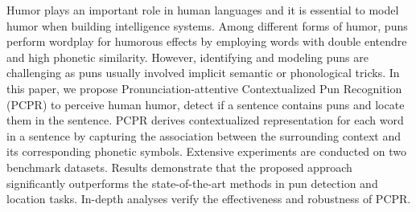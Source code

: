 Humor plays an important role in human languages and it is essential to model humor when building intelligence systems. Among different forms of humor, puns perform wordplay for humorous effects by employing words with double entendre and high phonetic similarity. However, identifying and modeling puns are challenging as puns usually involved implicit semantic or phonological tricks. In this paper, we propose Pronunciation-attentive Contextualized Pun Recognition (PCPR) to perceive human humor, detect if a sentence contains puns and locate them in the sentence.  PCPR derives contextualized representation for each word in a sentence by capturing the association between the surrounding context and its corresponding phonetic symbols. Extensive experiments are conducted on two benchmark datasets. Results demonstrate that the proposed approach significantly outperforms the state-of-the-art methods in pun detection and location tasks. In-depth analyses verify the effectiveness and robustness of PCPR.
